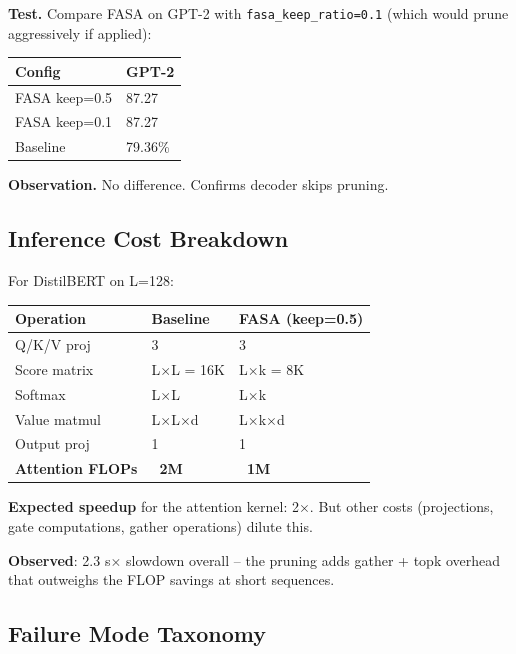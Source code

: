 \textbf{Test.} Compare FASA on GPT-2 with \texttt{fasa\_keep\_ratio=0.1} (which would 
prune aggressively if applied):

\begin{table}[H]
\centering
\small
\begin{tabular}{ll}
\toprule
\textbf{Config} & \textbf{GPT-2} \\
\midrule
FASA keep=0.5 & 87.27 \\
FASA keep=0.1 & 87.27 \\
Baseline & 79.36\% \\
\bottomrule
\end{tabular}
\end{table}

\textbf{Observation.} No difference. Confirms decoder skips pruning.

\subsection{Inference Cost Breakdown}

For DistilBERT on L=128:

\begin{table}[H]
\centering
\small
\begin{tabular}{lll}
\toprule
\textbf{Operation} & \textbf{Baseline} & \textbf{FASA (keep=0.5)} \\
\midrule
Q/K/V proj & 3 & 3 \\
Score matrix & L$\times$L = 16K & L$\times$k = 8K \\
Softmax & L$\times$L & L$\times$k \\
Value matmul & L$\times$L$\times$d & L$\times$k$\times$d \\
Output proj & 1 & 1 \\
\textbf{Attention FLOPs} & \textbf{~2M} & \textbf{~1M} \\
\bottomrule
\end{tabular}
\end{table}

\textbf{Expected speedup} for the attention kernel: 2$\times$. But other costs 
(projections, gate computations, gather operations) dilute this.

\textbf{Observed}: 2.3 s$\times$ slowdown overall -- the pruning adds gather + 
topk overhead that outweighs the FLOP savings at short sequences.

\subsection{Failure Mode Taxonomy}

